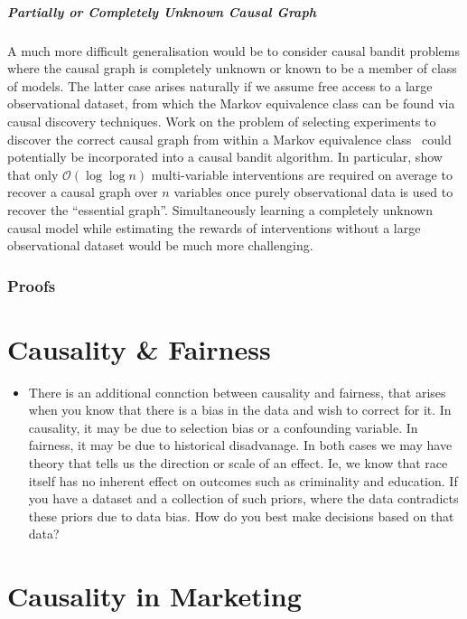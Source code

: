 \documentclass[11pt,a4paper,oneside]{book}
\newcommand{\bigo}[1]{\mathcal{O}\left( #1 \right)}
\begin{document}
\paragraph{Partially or Completely Unknown Causal Graph}
A much more difficult generalisation would be to consider causal bandit problems where the causal graph is completely unknown or known to be a member of class of models.
The latter case arises naturally if we assume free access to a large observational dataset, from which the Markov equivalence class can be found via causal discovery techniques. 
Work on the problem of selecting experiments to discover the correct causal graph from within a Markov equivalence class~\cite{Eberhardt2005,eberhardt2010causal,hauser2014two,Hu2014b} could potentially be incorporated into a causal bandit algorithm.
In particular, \citet{Hu2014b} show that only $\bigo{\log \log n}$ multi-variable interventions are required on average to recover a causal graph over $n$ variables once purely observational data is used to recover the ``essential graph''.
Simultaneously learning a completely unknown causal model while estimating the rewards of interventions without a large observational dataset would be much more challenging.

\subsection*{Proofs}


\chapter*{Causality \& Fairness}
\begin{itemize}
\item There is an additional connction between causality and fairness, that arises when you know that there is a bias in the data and wish to correct for it. In causality, it may be due to selection bias or a confounding variable. In fairness, it may be due to historical disadvanage. In both cases we may have theory that tells us the direction or scale of an effect. Ie, we know that race itself has no inherent effect on outcomes such as criminality and education. If you have a dataset and a collection of such priors, where the data contradicts these priors due to data bias. How do you best make decisions based on that data? 
\end{itemize}

\chapter*{Causality in Marketing}
\end{document}
